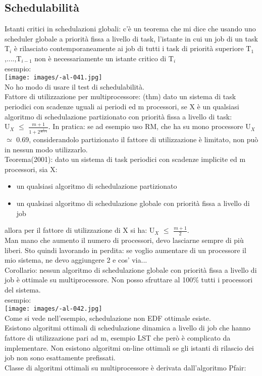 \documentclass{article}
\begin{document}
\subsection{Schedulabilità}
Istanti critici in schedulazioni globali: c'è un teorema che mi dice che usando uno scheduler globale a priorità fissa a livello di task, l'istante in cui un job di un task T$_{i}$ è rilasciato contemporaneamente ai job di tutti i task di priorità superiore T$_{1}$,....,T$_{i-1}$ non è necessariamente un istante critico di T$_{i}$\\ esempio:\\
\texttt{[image: images/-al-041.jpg]}\\ No ho modo di usare il test di schedulabilità.\\ Fattore di utilizzazione per multiprocessore: (thm) dato un sistema di task periodici con scadenze uguali ai periodi ed m processori, se X è un qualsiasi algoritmo di schedulazione partizionato con priorità fissa a livello di task:\\
U$_{X}$ $\leq$ $\frac{m + 1}{1 + 2^{\frac{1}{m +1}}}$. In pratica: se ad esempio uso RM, che ha su mono processore U$_{X}$ $\simeq$ 0.69, considerandolo partizionato il fattore di utilizzazione è limitato, non può in nessun modo utilizzarlo.\\ Teorema(2001): dato un sistema di task periodici con scadenze implicite ed m processori, sia X:
\begin{itemize}
\item un qualsiasi algoritmo di schedulazione partizionato
\item un qualsiasi algoritmo di schedulazione globale con priorità fissa a livello di job
\end{itemize}
allora per il fattore di utilizzazione di X si ha: U$_{X}$ $\leq$ $\frac{m + 1}{2}$.\\ Man mano che aumento il numero di processori, devo lasciarne sempre di più liberi. Sto quindi lavorando in perdita: se voglio aumentare di un processore il mio sistema, ne devo aggiungere 2 e cos' via...\\ Corollario: nessun algoritmo di schedulazione globale con priorità fissa a livello di job è ottimale su multiprocessore. Non posso sfruttare al 100\% tutti i processori del sistema.\\ esempio:\\
\texttt{[image: images/-al-042.jpg]}\\ Come si vede nell'esempio, schedulazione non EDF ottimale esiste.\\ Esistono algoritmi ottimali di schedulazione dinamica a livello di job che hanno fattore di utilizzazione pari ad m, esempio LST che però è complicato da implementare. Non esistono algoritmi on-line ottimali se gli istanti di rilascio dei job non sono esattamente prefissati.\\ Classe di algoritmi ottimali su multiprocessore è derivata dall'algoritmo Pfair:
\end{document}
